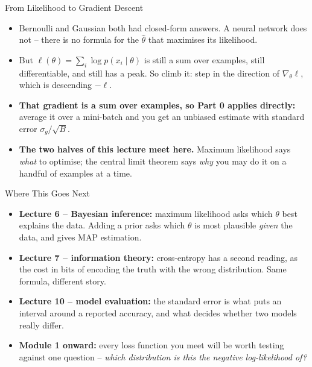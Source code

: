\begin{frame}{From Likelihood to Gradient Descent}
\begin{itemize}
  \item Bernoulli and Gaussian both had closed-form answers. A neural network does not -- there is no formula for the $\hat{\theta}$ that maximises its likelihood.
  \pause
  \item But $\ell(\theta) = \sum_i \log p(x_i \mid \theta)$ is still a sum over examples, still differentiable, and still has a peak. So climb it: step in the direction of $\nabla_\theta \ell$, which is descending $-\ell$.
  \pause
  \item \textbf{That gradient is a sum over examples, so Part 0 applies directly:} average it over a mini-batch and you get an unbiased estimate with standard error $\sigma_g/\sqrt{B}$.
  \pause
  \item \textbf{The two halves of this lecture meet here.} Maximum likelihood says \emph{what} to optimise; the central limit theorem says \emph{why} you may do it on a handful of examples at a time.
\end{itemize}
\end{frame}

\begin{frame}{Where This Goes Next}
\begin{itemize}
  \item \textbf{Lecture 6 -- Bayesian inference:} maximum likelihood asks which $\theta$ best explains the data. Adding a prior asks which $\theta$ is most plausible \emph{given} the data, and gives MAP estimation.
  \pause
  \item \textbf{Lecture 7 -- information theory:} cross-entropy has a second reading, as the cost in bits of encoding the truth with the wrong distribution. Same formula, different story.
  \pause
  \item \textbf{Lecture 10 -- model evaluation:} the standard error is what puts an interval around a reported accuracy, and what decides whether two models really differ.
  \pause
  \item \textbf{Module 1 onward:} every loss function you meet will be worth testing against one question -- \emph{which distribution is this the negative log-likelihood of?}
\end{itemize}
\end{frame}

